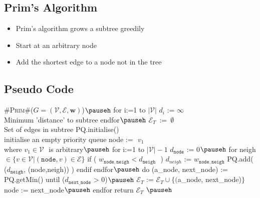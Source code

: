 \Outline %

\begin{slide}
\section[-2]{Prim's Algorithm}

\pausebuild
\color{TwoColor}
\begin{itemize}\squeeze
\item Prim's algorithm grows a subtree greedily\pauseh
\item Start at an arbitrary node\pauseh
\item Add the shortest edge to a node not in the tree
  \pause
\end{itemize}
  \vspace*{-1cm}
  \begin{center}\color{TextColor}
    \pause
  \end{center}
  \vspace*{-1cm}
\end{slide}



\begin{slide}
\section[-2.4]{Pseudo Code}

\begin{pseudo}
#\textsc{Prim}#($G=(\mathcal{V},\mathcal{E},\bm{w})$)$\pauseh$ {
   for i:=1 to $|\mathcal{V}|$
      $d_i$ := $\infty$               \\ Minimum 'distance' to subtree
   endfor$\pauseh$
   $\mathcal{E}_T\,$ := $\,\emptyset$                  \\ Set of edges in subtree
   PQ.initialise()       \\ initialise an empty priority queue
   node := $\,\,v_1$              \\ where $v_1\in\mathcal{V}\,\,$ is arbitrary$\pauseh$
   for i:=1 to $|\mathcal{V}|-1$
      $d_{\mathtt{node}}$ := 0$\pauseh$
      for neigh $\in \{v\in\mathcal{V}| (\mathtt{node},v)\in\mathcal{E}\}$
         if ( $w_{\mathtt{node,neigh}} < d_{\mathtt{neigh}}\,\,$  )
            $d_{neigh}$ := $w_{\mathtt{node,neigh}}$
            PQ.add( ($d_{\mathtt{neigh}}$, (node,neigh)) )
         endif
      endfor$\pauseh$
      do
         (a_node, next_node) := PQ.getMin()
      until ($d_{\mathtt{next\_node}}$  > 0)$\pauseh$
      $\mathcal{E}_T$ := $\mathcal{E}_T \cup \{($a_node, next_node)$\}$
      node := next_node$\pauseh$
   endfor
   return $\mathcal{E}_T$
}$\pauseh$
\end{pseudo}
\vspace*{-1cm}
\end{slide}

